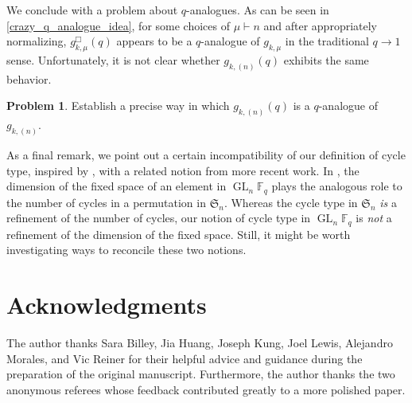 \documentclass[10pt]{article}
\theoremstyle{definition}
\DeclareMathOperator{\GL}{GL}
\newcommand{\F}{\mathbb{F}}
\newcommand{\FS}{\mathfrak{S}}
\newtheorem{problem}[cdrthm]{Problem}
\begin{document}
We conclude with a problem about \(q\)-analogues.
As can be seen in \eqref{crazy_q_analogue_idea}, for some choices of \(\mu \vdash n\) and after appropriately normalizing, \(g_{k,\mu}^\Box (q)\) appears to be a \(q\)-analogue of \(g_{k,\mu}\) in the traditional \(q \to 1\) sense.
Unfortunately, it is not clear whether \(g_{k,(n)} (q)\) exhibits the same behavior.

\begin{problem}
Establish a precise way in which \(g_{k,(n)} (q)\) is a \(q\)-analogue of \(g_{k,(n)}\).
\end{problem}



As a final remark, we point out a certain incompatibility of our definition of cycle type, inspired by \cite{kung,stong}, with a related notion from more recent work.
In \cite{HLR,LM,refl_fact}, the dimension of the fixed space of an element in \(\GL_n \F_q\) plays the analogous role to the number of cycles in a permutation in \(\FS_n\).
Whereas the cycle type in \(\FS_n\) \emph{is} a refinement of the number of cycles, our notion of cycle type in \(\GL_n \F_q\) is \emph{not} a refinement of the dimension of the fixed space.
Still, it might be worth investigating ways to reconcile these two notions.








\section*{Acknowledgments}

The author thanks
Sara Billey,
Jia Huang,
Joseph Kung,
Joel Lewis,
Alejandro Morales, and
Vic Reiner
for their helpful advice and guidance during the preparation of the original manuscript.
Furthermore, the author thanks the two anonymous referees whose feedback contributed greatly to a more polished paper.
\end{document}

